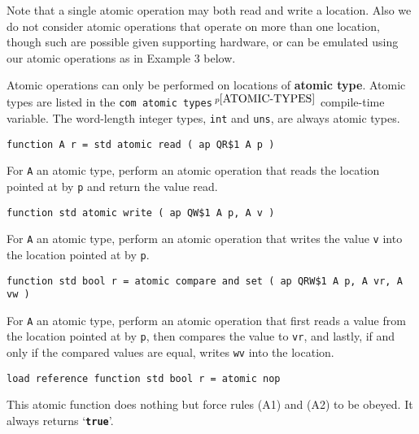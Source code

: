 \documentclass[12pt]{article}
\newcommand{\TT}[1]{{\tt \bfseries #1}}
\newcommand{\key}[1]{{\rm \bfseries #1}}
\newcommand{\pagnote}[1]{$\,^{p\pageref{#1}}$}
\newenvironment{indpar}[1][0.3in]%
	{\begin{list}{}%
		     {\setlength{\itemsep}{0in}%
		      \setlength{\topsep}{0in}%
		      \setlength{\parsep}{1ex}%
		      \setlength{\labelwidth}{#1}%
		      \setlength{\leftmargin}{#1}%
		      \addtolength{\leftmargin}{\labelsep}}%
	 \item}%
	{\end{list}}
\begin{document}
Note that a single atomic operation may both read and write a location.
Also we do not consider atomic operations that operate on more than
one location, though such are possible given supporting hardware, or can
be emulated using our atomic operations as in Example 3 below.

Atomic operations can only be performed on locations of \key{atomic type}.
Atomic types are listed in the {\tt com atomic types}\pagnote{ATOMIC-TYPES}
compile-time variable.
The word-length integer types, {\tt int} and {\tt uns}, are
always atomic types.

{\tt function A r = std atomic read ( ap QR\$1 A p )}
\begin{indpar}
For {\tt A} an atomic type,
perform an atomic operation that reads the location
pointed at by {\tt p} and return the value read.
\end{indpar}

{\tt function std atomic write ( ap QW\$1 A p, A v )}
\begin{indpar}
For {\tt A} an atomic type,
perform an atomic operation that writes the value {\tt v}
into the location pointed at by {\tt p}.
\end{indpar}

{\tt function std bool r =
	atomic compare and set ( ap QRW\$1 A p, A vr, A vw )}
\begin{indpar}
For {\tt A} an atomic type,
perform an atomic operation that first reads a value from the location
pointed at by {\tt p}, then compares the value to {\tt vr}, and lastly,
if and only if the compared values are equal, writes {\tt wv} into the
location.
\end{indpar}

{\tt load reference function std bool r = atomic nop}
\begin{indpar}
This atomic function does nothing but force rules (A1) and (A2) to be
obeyed.  It always returns `\TT{true}'.
\end{indpar}
\end{document}
